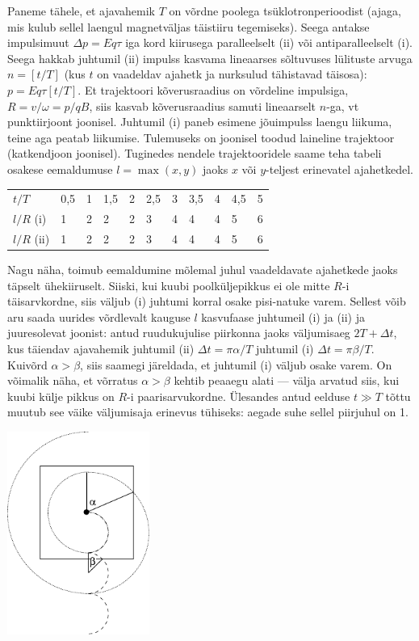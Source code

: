 \documentclass[10pt]{article}
\begin{document}
{%

\solu
Paneme tähele, et ajavahemik $T$ on võrdne poolega tsüklotronperioodist (ajaga, mis kulub sellel laengul magnetväljas täistiiru tegemiseks).
Seega antakse impulsimuut $\Delta p=Eq\tau$ iga kord kiirusega paralleelselt (ii) 
või antiparalleelselt (i). Seega hakkab juhtumil (ii) impulss kasvama lineaarses sõltuvuses lülituste arvuga $n=[t/T]$ (kus $t$ on vaadeldav
ajahetk ja nurksulud tähistavad täisosa): $p=Eq\tau[t/T]$. Et trajektoori kõverusraadius on võrdeline impulsiga, $R=v/\omega=p/qB$, siis 
kasvab kõverusraadius samuti lineaarselt $n$-ga, vt punktiirjoont joonisel. 
Juhtumil (i) paneb esimene jõuimpulss laengu liikuma, teine aga peatab liikumise. Tulemuseks on joonisel toodud laineline trajektoor (katkendjoon joonisel).
Tuginedes nendele trajektooridele saame teha tabeli osakese eemaldumuse $l = \max (x,y)$ jaoks $x$ või $y$-teljest erinevatel ajahetkedel.

\begin{tabular}{lllllllllll}
	$t/T$ & 0,5 & 1 & 1,5 & 2 & 2,5 & 3 & 3,5 & 4 & 4,5 & 5 \\
	$l/R$ (i) & 1 & 2 & 2 & 2 & 3 & 4 & 4 & 4 & 5 & 6 \\
	$l/R$ (ii) & 1 & 2 & 2 & 2 & 3 & 4 & 4 & 4 & 5 & 6
\end{tabular}

Nagu näha, toimub eemaldumine mõlemal juhul vaadeldavate ajahetkede jaoks täpselt ühekiiruselt. Siiski, kui kuubi poolküljepikkus ei ole 
mitte $R$-i täisarvkordne, siis väljub (i) juhtumi korral osake pisi-natuke varem. Sellest võib aru saada uurides võrdlevalt 
kauguse $l$ kasvufaase juhtumeil (i) ja (ii) ja juuresolevat joonist: antud ruudukujulise piirkonna jaoks väljumisaeg $2T+\Delta t$, kus
täiendav ajavahemik juhtumil (ii) $\Delta t=\pi \alpha/T$ juhtumil (i) $\Delta t=\pi \beta/T$.
Kuivõrd $\alpha > \beta$, siis saamegi järeldada, et juhtumil (i) väljub osake varem. On võimalik näha, et võrratus 
$\alpha > \beta$ kehtib peaaegu alati --- välja arvatud siis, kui kuubi külje pikkus on $R$-i paarisarvukordne.
Ülesandes antud eelduse $t\gg T$ tõttu muutub see väike väljumisaja erinevus tühiseks: aegade suhe sellel piirjuhul on 1.
\begin{center}
	\includegraphics[width=0.35\textwidth]{2010-lahg-08-lah}
\end{center}
\probend
\bigskip

}
\end{document}
